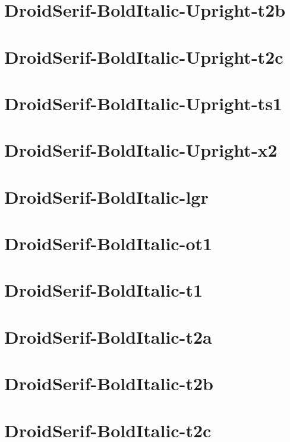 \documentclass{article}
\begin{document}
\section{DroidSerif-BoldItalic-Upright-t2b}

\section{DroidSerif-BoldItalic-Upright-t2c}

\section{DroidSerif-BoldItalic-Upright-ts1}

\section{DroidSerif-BoldItalic-Upright-x2}

\section{DroidSerif-BoldItalic-lgr}

\section{DroidSerif-BoldItalic-ot1}

\section{DroidSerif-BoldItalic-t1}

\section{DroidSerif-BoldItalic-t2a}

\section{DroidSerif-BoldItalic-t2b}

\section{DroidSerif-BoldItalic-t2c}
\end{document}
